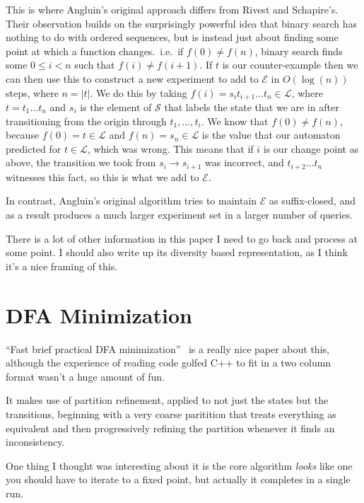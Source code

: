 \documentclass[a4paper]{book}
\begin{document}
This is where Angluin's original approach differs from Rivest and Schapire's.
Their observation builds on the surprisingly powerful idea that binary search has nothing to do with ordered sequences,
but is instead just about finding some point at which a function changes.\ 
i.e.\ if \(f(0) \neq f(n)\),
binary search finds some \(0 \leq i < n\) such that \(f(i) \neq f(i + 1)\).
If \(t\) is our counter-example then we can then use this to construct a new experiment to add to \(\mathcal{E}\) in \(O(\log(n))\) steps,
where \(n = |t|\).
We do this by taking \(f(i) = s_i t_{i+1} \ldots t_{n} \in \mathcal{L}\),
where \(t = t_1 \ldots t_n\) and \(s_i\) is the element of \(\mathcal{S}\) that labels the state that we are in after transitioning from the origin through
\(t_1, \ldots, t_i\).
We know that \(f(0) \neq f(n)\),
because \(f(0) = t \in \mathcal{L}\) and \(f(n) = s_n \in \mathcal{L}\) is the value that our automaton predicted for \(t \in \mathcal{L}\),
which was wrong.
This means that if \(i\) is our change point as above,
the transition we took from \(s_i \to s_{i + 1}\) was incorrect,
and \(t_{i + 2} \ldots t_n\) witnesses this fact,
so this is what we add to \(\mathcal{E}\).

In contrast,
Angluin's original algorithm tries to maintain \(\mathcal{E}\) as suffix-closed,
and as a result produces a much larger experiment set in a larger number of queries.

There is a lot of other information in this paper I need to go back and process at some point.
I should also write up its diversity based representation,
as I think it's a nice framing of this.

\section{DFA Minimization}

``Fast brief practical DFA minimization''~\cite{DBLP:journals/ipl/Valmari12} is a really nice paper about this,
although the experience of reading code golfed C++ to fit in a two column format wasn't a huge amount of fun.

It makes use of partition refinement,
applied to not just the states but the transitions,
beginning with a very coarse paritition that treats everything as equivalent and then progressively refining the partition whenever it finds an inconsistency.

One thing I thought was interesting about it is the core algorithm \emph{looks} like one you should have to iterate to a fixed point,
but actually it completes in a single run.
\end{document}
